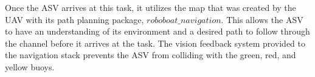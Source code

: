 \documentclass[letterpaper, 12 pt, conference]{ieeeconf}
\begin{document}
Once the ASV arrives at this task, it utilizes the map that was created by the UAV with its path planning package, $roboboat\_navigation$. This allows the ASV to have an understanding of its environment and a desired path to follow through the channel before it arrives at the task. The vision feedback system provided to the navigation stack prevents the ASV from colliding with the green, red, and yellow buoys.
\end{document}
